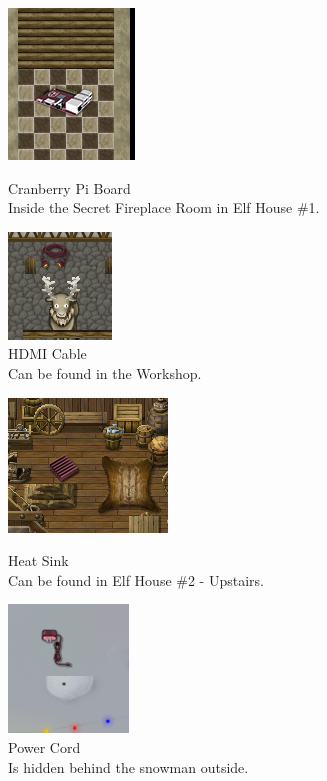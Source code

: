 \documentclass[writeup.tex]{subfiles}
\begin{document}
		
		\begin{figure}[H]
			\centering
			\begin{minipage}{.5\textwidth}
				\centering
				\includegraphics[scale=1]{"screenshots/items/Cranberry Pi - Cranberry Pi Board"}
			\caption{Cranberry Pi Board\\Inside the Secret Fireplace Room in Elf House \#1.}
			\end{minipage}%
			\begin{minipage}{.5\textwidth}
				\centering
				\includegraphics[scale=1]{"screenshots/items/Cranberry Pi - HDMI Cable"}
				\caption{HDMI Cable\\Can be found in the Workshop.}
			\end{minipage}
		\end{figure}
		\begin{figure}[H]
			\centering
			\begin{minipage}{.5\textwidth}
				\centering
				\includegraphics[scale=1]{"screenshots/items/Cranberry Pi - Heat Sink"}
				\caption{Heat Sink\\Can be found in Elf House \#2 - Upstairs.}
			\end{minipage}%
			\begin{minipage}{.5\textwidth}
				\centering
				\includegraphics[scale=1]{"screenshots/items/Cranberry Pi - Power Cord"}
			\caption{Power Cord\\Is hidden behind the snowman outside.}
			\end{minipage}
		\end{figure}
\end{document}
